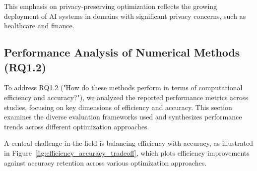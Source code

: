 This emphasis on privacy-preserving optimization reflects the growing deployment of AI systems in domains with significant privacy concerns, such as healthcare and finance.

\subsection{Performance Analysis of Numerical Methods (RQ1.2)}
To address RQ1.2 ("How do these methods perform in terms of computational efficiency and accuracy?"), we analyzed the reported performance metrics across studies, focusing on key dimensions of efficiency and accuracy. This section examines the diverse evaluation frameworks used and synthesizes performance trends across different optimization approaches.

A central challenge in the field is balancing efficiency with accuracy, as illustrated in Figure~\ref{fig:efficiency_accuracy_tradeoff}, which plots efficiency improvements against accuracy retention across various optimization approaches.

